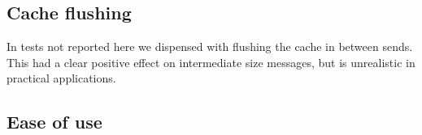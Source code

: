 \begin{comment}
  \subsection{Eager limit}

  Most MPI implementations have a switch-over between the `eager
  protocol', where messages are send without handshake, and a
  `rendezvous' protocol that does involve acknowledgement.
  From its nature, the eager protocol relies on sufficient buffer space,
  so there is an `eager limit'. One typically observes that messages
  just over the eager limit can perform worse (at least per byte) than
  once just under.

  The effects of the eager limit are visible in most plots, with the
  following remarks:
  \begin{itemize}
  \item As is to be expected, we mostly see a performance drop at the
    eager limit for all send schemes. For one-sided puts it is less
    pronounced, and for the packing scheme it largely drowns in the
    overhead.
  \item On Cray-mpich we see the performance drop for the reference
    speed, and at double the data sizes for the packing scheme. For the
    other schemes not much of a drop is visible. The reason for this is
    unclear.
  \end{itemize}

  We have tested setting the eager limit over the maximum message size,
  but this did not appreciably change the results for large messages.
\end{comment}

\subsection{Cache flushing}


In tests not reported here we dispensed with flushing the cache in
between sends. This had a clear positive effect on intermediate size messages,
but is unrealistic in practical applications.

\subsection{Ease of use}

